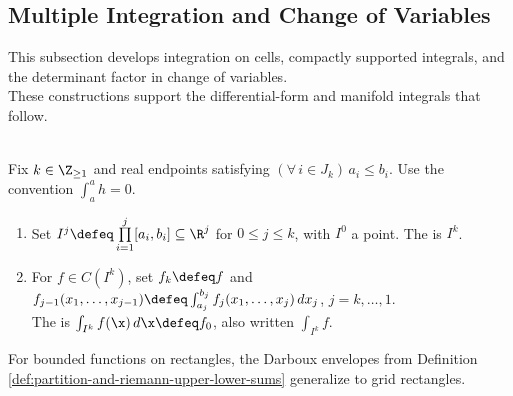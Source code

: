 \subsection{Multiple Integration and Change of Variables}

%

This subsection develops integration on cells, compactly supported integrals, and the determinant factor in change of variables.\\
These constructions support the differential-form and manifold integrals that follow.

\begin{definition} \label{def:k-cell-and-multiple-integral} \\
Fix $k\in\Z_{\geq1}$ and real endpoints satisfying $(\forall\,i\in J_k)\,a_i\leq b_i$. Use the convention $\int_a^a h=0$.
\begin{enumerate}[label=(\roman*)]
\setlength{\itemsep}{0pt}
\item Set $I^j\defeq\prod\limits_{i=1}^{j}[a_i,b_i]\subseteq\R^j$ for $0\leq j\leq k$, with $I^0$ a point. The  is $I^k$.
\item For $f\in C(I^k)$, set $f_k\defeq f$ and $f_{j-1}(x_1,\ldots,x_{j-1})\defeq\int_{a_j}^{b_j}f_j(x_1,\ldots,x_j)\,dx_j$, $j=k,\ldots,1$.\\
The  is $\int_{I^k}f(\x)\,d\x\defeq f_0$, also written $\int_{I^k}f$.
\end{enumerate}
\end{definition}

For bounded functions on rectangles, the Darboux envelopes from Definition \ref{def:partition-and-riemann-upper-lower-sums} generalize to grid rectangles.

